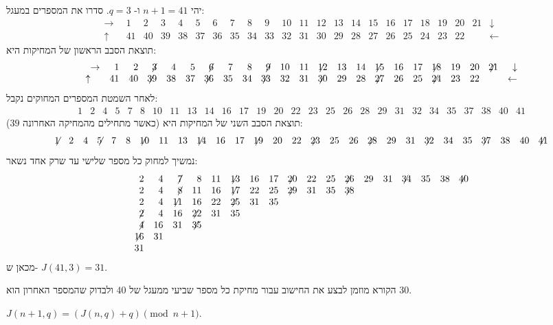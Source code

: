 \begin{example}
יהי
$n+1=41$
ו-%
$q=3$.
סדרו את המספרים במעגל:
\[
\begin{array}{rrrrrrrrrrrrrrrrrrrrrrr}
\rightarrow&1&2&3&4&5&6&7&8&9&10&
           11&12&13&14&15&16&17&18&19&20&21&
\downarrow\\
\uparrow\quad&41&40&39&38&37&36&35&34&33&
32&31&30&29&28&27&26&25&24&23&22&
&\leftarrow
\end{array}
\]
תוצאת הסבב הראשון של המחיקות היא:
\[
\begin{array}{rrrrrrrrrrrrrrrrrrrrrrr}
\rightarrow&1&2&\not\! 3&4&5&\not\! 6&7&8&\not\! 9&10&
           11&\not\!\! 12&13&14&\not\!\! 15&16&17&\not\!\! 18&19&20&\not\!\! 21&
\downarrow\\
	\uparrow\quad&41&40&\not\!\! 39&38&37&\not\!\! 36&35&34&\not\!\! 33&
32&31&\not\!\! 30&29&28&\not\!\! 27&26&25&\not\!\! 24&23&22&
&\leftarrow
\end{array}
\]
לאחר השמטת המספרים המחוקים נקבל:
\[
\begin{array}{rrrrrrrrrrrrrrrrrrrrrrrrrrrr}
1&2&4&5&7&8&10&11&13&14&16&17&19&20&
22&23&25&26&28&29&31&32&34&35&37&38&40&41
\end{array}
\]
תוצאת הסבב השני של המחיקות היא (כאשר מתחילים מהמחיקה האחרונה
$39$):
\[
\begin{array}{rrrrrrrrrrrrrrrrrrrrrrrrrrrr}
\not\!\! 1&2&4&\not\!\! 5&7&8&\not\!\! 10&11&13&\not\!\! 14&16&17&\not\!\! 19&20&
22&\not\!\! 23&25&26&\not\!\! 28&29&31&\not\!\! 32&34&35&\not\!\! 37&38&40&\not\!\! 41
\end{array}
\]
נמשיך למחוק כל מספר שלישי עד שרק אחד נשאר:
\[
\begin{array}{rrrrrrrrrrrrrrrrrr}
2&4&\not\!7&8&11&\not\!\!13&16&17&\not\!\!20&22&25&\not\!\!26&29&31&\not\!\!34&35&38&\not\!\!40
\\
2&4&\not\!8&11&16&\not\!\!17&22&25&\not\!\!29&31&35&\not\!\!38
\\
2&4&\not\!\!11&16&22&\not\!\!25&31&35
\\
\not\!2&4&16&\not\!\!22&31&35
\\
\not\!4&16&31&\not\!\!35
\\
\not\!\!16&31
\\
31
\end{array}
\]
מכאן ש-%
$J(41,3)=31$.
\end{example}
הקורא מוזמן לבצע את החישוב עבור מחיקת כל מספר שביעי ממעגל של 
$40$
ולבדוק שהמספר האחרון הוא
$30$.

\begin{theorem}\label{thm.jo1}
$J(n+1,q)=(J(n,q)+q) \pmod {n+1}$.
\end{theorem}

